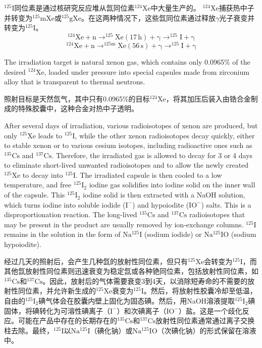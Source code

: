 \documentclass[dvipsnames, svgnames,a4paper,11pt]{article}
\begin{document}
\(\mathrm{^{125}I}\)同位素是通过核研究反应堆从氙同位素\(\mathrm{^{124}Xe}\)中大量生产的。 \(\mathrm{^{124}Xe}\)捕获热中子并转变为\(\mathrm{^{125}mXe}\)或\(\mathrm{^{125}gXe}\)。在这两种情况下，这些氙同位素通过释放$\gamma$光子衰变并转变为\(\mathrm{^{125}I}\)。
\[
\mathrm{^{124}Xe + n \rightarrow ^{125}Xe (17 \,h) + \gamma \rightarrow ^{125}I + \gamma}
\]
\[
\mathrm{^{124}Xe + n \rightarrow ^{125m}Xe (56 \,s) + \gamma \rightarrow ^{125}I + \gamma}
\]

The irradiation target is natural xenon gas, which contains only 0.0965\% of the desired \(\mathrm{^{124}Xe}\), loaded under pressure into special capsules made from zirconium alloy that is transparent to thermal neutrons.

照射目标是天然氙气，其中只有0.0965\%的目标\(\mathrm{^{124}Xe}\)，将其加压后装入由锆合金制成的特殊胶囊中，这种合金对热中子透明。

After several days of irradiation, various radioisotopes of xenon are produced, but only \(\mathrm{^{125}Xe}\) leads to \(\mathrm{^{125}I}\), while the other xenon radioisotopes decay quickly, either to stable xenon or to various cesium isotopes, including radioactive ones such as \(\mathrm{^{135}Cs}\) and \(\mathrm{^{137}Cs}\). Therefore, the irradiated gas is allowed to decay for 3 or 4 days to eliminate short-lived unwanted radioisotopes and to allow the newly created \(\mathrm{^{125}Xe}\) to decay into \(\mathrm{^{125}I}\). The irradiated capsule is then cooled to a low temperature, and free \(\mathrm{^{125}I_2}\) iodine gas solidifies into iodine solid on the inner wall of the capsule. This \(\mathrm{^{125}I_2}\) iodine solid is then extracted with a NaOH solution, which turns iodine into soluble iodide (\(\mathrm{I^{-}}\)) and hypoiodite (\(\mathrm{IO^{-}}\)) salts. This is a disproportionation reaction. The long-lived \(\mathrm{^{135}Cs}\) and \(\mathrm{^{137}Cs}\) radioisotopes that may be present in the product are usually removed by ion-exchange columns. \(\mathrm{^{125}I}\) remains in the solution in the form of \(\mathrm{Na^{125}I}\) (sodium iodide) or \(\mathrm{Na^{125}IO}\) (sodium hypoiodite).

经过几天的照射后，会产生几种氙的放射性同位素，但只有\(\mathrm{^{125}Xe}\)会转变为\(\mathrm{^{125}I}\)，而其他氙放射性同位素则迅速衰变为稳定氙或各种铯同位素，包括放射性同位素，如\(\mathrm{^{135}Cs}\)和\(\mathrm{^{137}Cs}\)。因此，放射后的气体需要衰变3到4天，以消除短寿命的不需要的放射性同位素，并允许新生成的\(\mathrm{^{125}Xe}\)衰变为\(\mathrm{^{125}I}\)。然后，将放射性胶囊冷却至低温，自由的\(\mathrm{^{125}I_2}\)碘气体会在胶囊内壁上固化为固态碘。然后，用NaOH溶液提取\(\mathrm{^{125}I_2}\)碘固体，将碘转化为可溶性碘离子（\(\mathrm{I^{-}}\)）和次碘离子（\(\mathrm{IO^{-}}\)）盐。这是一个歧化反应。可能在产品中存在的长期存在的\(\mathrm{^{135}Cs}\)和\(\mathrm{^{137}Cs}\)放射性同位素通常通过离子交换柱去除。最终，\(\mathrm{^{125}I}\)以\(\mathrm{Na^{125}I}\)（碘化钠）或\(\mathrm{Na^{125}IO}\)（次碘化钠）的形式保留在溶液中。
\end{document}
